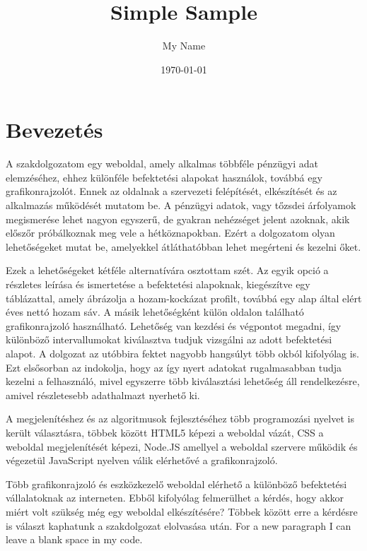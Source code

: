 \documentclass{article} %
\title{Simple Sample} %
\author{My Name} %
\date{\today} %
\begin{document}
\section{Bevezetés}

		A szakdolgozatom egy weboldal, amely alkalmas többféle pénzügyi adat elemzéséhez, ehhez különféle befektetési alapokat használok, továbbá egy grafikonrajzolót. Ennek az oldalnak a szervezeti felépítését, elkészítését és az alkalmazás működését mutatom be.
A pénzügyi adatok, vagy tőzsdei árfolyamok megismerése lehet nagyon egyszerű, de gyakran nehézséget jelent azoknak, akik előszőr próbálkoznak meg vele a hétköznapokban. Ezért a dolgozatom olyan lehetőségeket mutat be, amelyekkel átláthatóbban lehet megérteni és kezelni őket.

	Ezek a lehetőségeket kétféle alternatívára osztottam szét. Az egyik opció a részletes leírása és ismertetése a befektetési alapoknak, kiegészítve egy táblázattal, amely ábrázolja a hozam-kockázat profilt, továbbá egy alap által elért éves nettó hozam sáv. A másik lehetőségként külön oldalon található grafikonrajzoló használható. Lehetőség van kezdési és végpontot megadni, így különböző intervallumokat kiválasztva tudjuk vizsgálni az adott befektetési alapot. A dolgozat az utóbbira fektet nagyobb hangsúlyt több okból kifolyólag is. Ezt elsősorban az indokolja, hogy az így nyert adatokat rugalmasabban tudja kezelni a felhasználó, mivel egyszerre több kiválasztási lehetőség áll rendelkezésre, amivel részletesebb adathalmazt nyerhető ki.

	A megjelenítéshez és az algoritmusok fejlesztéséhez több programozási nyelvet is került választásra, többek között HTML5 képezi a weboldal vázát, CSS a weboldal megjelenítését képezi, Node.JS amellyel a weboldal szervere működik és végezetül JavaScript nyelven válik elérhetővé a grafikonrajzoló.

	Több grafikonrajzoló és eszközkezelő weboldal elérhető a különböző befektetési vállalatoknak az interneten.  Ebből kifolyólag felmerülhet a kérdés, hogy akkor miért volt szükség még egy weboldal elkészítésére? Többek között erre a kérdésre is választ kaphatunk a szakdolgozat elolvasása után.
    For a new paragraph I can leave a blank space in my code. 
\end{document}
